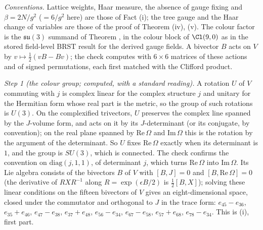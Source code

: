 \emph{Conventions.} Lattice weights, Haar measure, the absence of gauge fixing and $\beta = 2N/g^{2}$ ($= 6/g^{2}$ here) are those of Fact (i); the tree gauge and the Haar change of variables are those of the proof of Theorem (iv), (v). The colour factor is the $\mathfrak{su}(3)$ summand of Theorem , in the colour block of $\Cl(9,0)$ as in the stored field-level BRST result for the derived gauge fields. A bivector $B$ acts on $V$ by $v \mapsto \tfrac12(vB - Bv)$; the check computes with $6 \times 6$ matrices of these actions and of signed permutations, each first matched with the Clifford product.

\emph{Step 1 (the colour group; computed, with a standard reading).} A rotation $U$ of $V$ commuting with $j$ is complex linear for the complex structure $j$ and unitary for the Hermitian form whose real part is the metric, so the group of such rotations is $U(3)$. On the complexified trivectors, $U$ preserves the complex line spanned by the $J$-volume form, and acts on it by its $J$-determinant (or its conjugate, by convention); on the real plane spanned by $\mathrm{Re}\,\Omega$ and $\mathrm{Im}\,\Omega$ this is the rotation by the argument of the determinant. So $U$ fixes $\mathrm{Re}\,\Omega$ exactly when its determinant is $1$, and the group is $SU(3)$, which is connected. The check confirms the convention on $\mathrm{diag}(j, 1, 1)$, of determinant $j$, which turns $\mathrm{Re}\,\Omega$ into $\mathrm{Im}\,\Omega$. Its Lie algebra consists of the bivectors $B$ of $V$ with $[B, J] = 0$ and $[B, \mathrm{Re}\,\Omega] = 0$ (the derivative of $RXR^{-1}$ along $R = \exp(\epsilon B/2)$ is $\tfrac12[B, X]$); solving these linear conditions on the fifteen bivectors of $V$ gives an eight-dimensional space, closed under the commutator and orthogonal to $J$ in the trace form: $e_{45} - e_{36}$, $e_{35} + e_{46}$, $e_{47} - e_{38}$, $e_{37} + e_{48}$, $e_{56} - e_{34}$, $e_{67} - e_{58}$, $e_{57} + e_{68}$, $e_{78} - e_{34}$. This is (i), first part.

